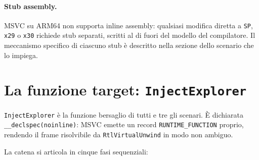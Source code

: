 \paragraph{Stub assembly.}

MSVC su ARM64 non supporta inline assembly: qualsiasi modifica diretta
a \texttt{SP}, \texttt{x29} o \texttt{x30} richiede stub separati, scritti
al di fuori del modello del compilatore. Il meccanismo specifico di ciascuno
stub è descritto nella sezione dello scenario che lo impiega.


\section*{La funzione target: \texttt{InjectExplorer}}

\texttt{InjectExplorer} è la funzione bersaglio di tutti e tre gli scenari.
È dichiarata \texttt{\_\_declspec(noinline)}: MSVC emette un record
\texttt{RUNTIME\_FUNCTION} proprio, rendendo il frame risolvibile da
\texttt{RtlVirtualUnwind} in modo non ambiguo.



La catena si articola in cinque fasi sequenziali:

